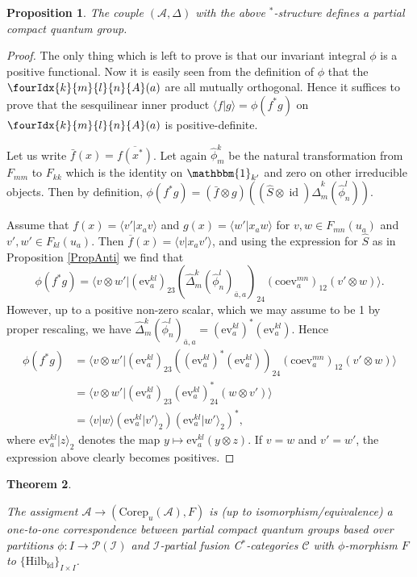\documentclass[10pt]{article}
\DeclareMathOperator{\fin}{\mathrm{fd}}
\DeclareMathOperator{\id}{id}
\newcommand{\Corep}{\mathrm{Corep}}
\newcommand{\CatCC}{\mathscr{C}}
\newcommand{\Hilb}{\mathrm{Hilb}}
\newcommand{\ev}{\mathrm{ev}}
\newcommand{\coev}{\mathrm{coev}}
\newcommand{\Unitb}{\mathbbm{1}}
\newcommand{\Gr}[5]{\fourIdx{#2}{#4}{#3}{#5}{#1}}%
\newtheorem{Theorem}{Theorem}[section]
\newtheorem{Prop}[Theorem]{Proposition}
\theoremstyle{definition}
\numberwithin{equation}{section}
\begin{document}
\begin{Prop} The couple $(\mathscr{A},\Delta)$ with the above $^*$-structure defines a partial compact quantum group.
\end{Prop}
\begin{proof} The only thing which is left to prove is that our
  invariant integral $\phi$ is a positive functional. Now it is easily
  seen from the definition of $\phi$ that the $\Gr{A}{k}{l}{m}{n}(a)$
  are all mutually orthogonal. Hence it suffices to prove that the
  sesquilinear inner product $\langle f| g\rangle = \phi(f^*g)$ on
  $\Gr{A}{k}{l}{m}{n}(a)$ is positive-definite.

  Let us write $\bar{f}(x) = \overline{f(x^*)}$. Let again
  $\hat{\phi}^k_m$ be the natural transformation from $F_{mm}$ to
  $F_{kk}$ which is the identity on $\Unitb_{k'}$ and zero on other
  irreducible objects. Then by definition, $\phi(f^*g) =
  (\bar{f}\otimes g)((\hat{S}\otimes
  \id)\hat{\Delta}^k_m(\hat{\phi}^l_n)).$

Assume  that $f(x) = \langle v'| x_a v\rangle$ and
  $g(x) = \langle w' | x_aw\rangle$ for $v,w\in F_{mn}(u_a)$ and
  $v',w'\in F_{kl}(u_a)$. Then
  $\overline{f}(x) = \langle v|x_{a} v'\rangle$, and
 using the expression for $\hat{S}$ as
  in Proposition \ref{PropAnti} we find that
  \[
    \phi(f^*g) = \langle v \otimes w'|
    (\ev_{a}^{kl})_{23} 
    (\hat\Delta^{k}_{m}(\hat \phi^{l}_{n})_{\bar a, a})_{24} 
    (\coev^{mn}_{a})_{12} (v'\otimes
    w)\rangle.\]
  However, up to a positive non-zero scalar, which we may assume to be
  1 by proper rescaling, we
  have $\hat{\Delta}^k_m(\hat{\phi}^l_n)_{\bar{a}, a} =
  (\ev^{kl}_{a})^{*}(\ev^{kl}_{a}).$ Hence
  \begin{align*}
    \phi(f^*g) &=
\langle v \otimes w'|     (\ev^{kl}_{a})_{23}  (
  (\ev^{kl}_{a})^{*}(\ev^{kl}_{a}))_{24}
 (\coev^{mn}_{a})_{12} (v'\otimes w)\rangle \\
&= \langle v \otimes w'|        (\ev^{kl}_{a})_{23} 
  (\ev^{kl}_{a})^{*}_{24}
 (w\otimes v')\rangle \\
    &= \langle v|w\rangle (\ev^{kl}_{a}|v'\rangle_{2})
    (\ev_{a}^{kl}|w'\rangle_{2})^{*},
  \end{align*}
where $\ev_{a}^{kl}|z\rangle_{2}$ denotes the map $y \mapsto
\ev_{a}^{kl}(y\otimes z)$.
If $v=w$ and $v'=w'$, the expression above clearly becomes positives.
\end{proof} 

\begin{Theorem} \label{TheoTKPCQG}

The assigment $\mathscr{A}\rightarrow (\Corep_u(\mathscr{A}),F)$ is (up to isomorphism/equivalence) a one-to-one correspondence between partial compact quantum groups based over partitions $\phi:I\rightarrow \mathscr{P}(\mathscr{I})$ and $\mathscr{I}$-partial fusion C$^*$-categories $\CatCC$ with $\phi$-morphism $F$ to $\{\Hilb_{\fin}\}_{I\times I}$.
\end{Theorem} 
\end{document}
